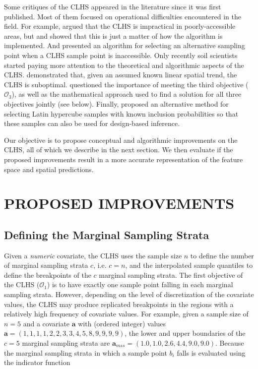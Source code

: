 Some critiques of the CLHS appeared in the literature since it was first published. Most of them focused on 
operational difficulties encountered in the field. For example, \citet{CambuleEtAl2013} argued that the 
CLHS is impractical in poorly-accessible areas, but \citet{RoudierEtAl2012} and 
\citet{MulderEtAl2013} showed that this is just a matter of how the algorithm is implemented. And 
\citet{CliffordEtAl2014} presented an algorithm for selecting an alternative sampling point when a CLHS 
sample point is inaccessible. Only recently soil scientists started paying more attention to the theoretical 
and algorithmic aspects of the CLHS. \citet{MinasnyEtAl2010a} demonstrated that, given an assumed known 
linear spatial trend, the CLHS is suboptimal. \citet{CliffordEtAl2014} questioned the importance of 
meeting the third objective ($\mathcal{O}_3$), as well as the mathematical approach used to find a solution 
for all three objectives jointly (see below). Finally, \citet{Brus2015} proposed an alternative method 
for selecting Latin hypercube samples with known inclusion probabilities so that these samples can also be 
used for design-based inference.

Our objective is to propose conceptual and algorithmic improvements on the CLHS, all of which we describe in 
the next section. We then evaluate if the proposed improvements result in a more accurate representation of 
the feature space and spatial predictions.

\section{PROPOSED IMPROVEMENTS}

\subsection{Defining the Marginal Sampling Strata}

Given a \emph{numeric} covariate, the CLHS uses the sample size $n$ to define the number of marginal 
sampling strata $c$, i.e. $c = n$, and the interpolated sample quantiles to define the breakpoints of the 
$c$ marginal sampling strata. The first objective of the CLHS ($\mathcal{O}_1$) is to have exactly one 
sample point falling in each marginal sampling strata. However, depending on the level of discretization of 
the covariate values, the CLHS may produce replicated breakpoints in the regions with a relatively high 
frequency of covariate values. For example, given a sample size of $n = 5$ and a covariate $\boldsymbol{a}$ 
with (ordered integer) values $\boldsymbol{a} = (1, 1, 1, 1, 2, 2, 3, 3, 4, 5, 8, 9, 9, 9, 9)$, the lower and 
upper boundaries of the $c = 5$ marginal sampling strata are $\boldsymbol{a}_{mss} = (1.0, 1.0, 2.6, 4.4, 9.0, 
9.0)$. 
Because the marginal sampling strata in which a sample point $b_i$ falls is evaluated using the indicator 
function

